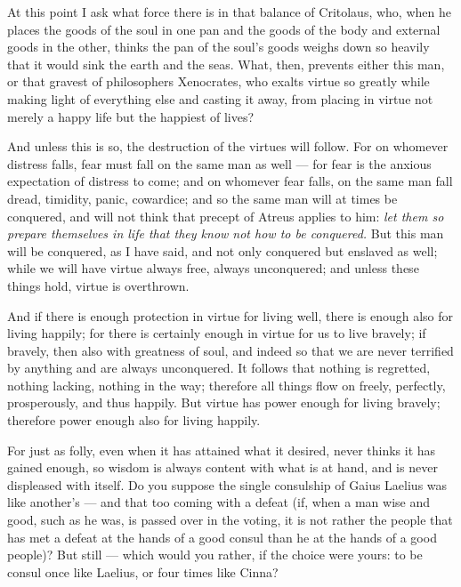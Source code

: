  At this point I ask what force there is in that balance of Critolaus, who, when he places the goods of the soul in one pan and the goods of the body and external goods in the other, thinks the pan of the soul's goods weighs down so heavily that it would sink the earth and the seas. What, then, prevents either this man, or that gravest of philosophers Xenocrates, who exalts virtue so greatly while making light of everything else and casting it away, from placing in virtue not merely a happy life but the happiest of lives?

 And unless this is so, the destruction of the virtues will follow. For on whomever distress falls, fear must fall on the same man as well — for fear is the anxious expectation of distress to come; and on whomever fear falls, on the same man fall dread, timidity, panic, cowardice; and so the same man will at times be conquered, and will not think that precept of Atreus applies to him: \textit{let them so prepare themselves in life that they know not how to be conquered.} But this man will be conquered, as I have said, and not only conquered but enslaved as well; while we will have virtue always free, always unconquered; and unless these things hold, virtue is overthrown.

 And if there is enough protection in virtue for living well, there is enough also for living happily; for there is certainly enough in virtue for us to live bravely; if bravely, then also with greatness of soul, and indeed so that we are never terrified by anything and are always unconquered. It follows that nothing is regretted, nothing lacking, nothing in the way; therefore all things flow on freely, perfectly, prosperously, and thus happily. But virtue has power enough for living bravely; therefore power enough also for living happily.

 For just as folly, even when it has attained what it desired, never thinks it has gained enough, so wisdom is always content with what is at hand, and is never displeased with itself. Do you suppose the single consulship of Gaius Laelius was like another's — and that too coming with a defeat (if, when a man wise and good, such as he was, is passed over in the voting, it is not rather the people that has met a defeat at the hands of a good consul than he at the hands of a good people)? But still — which would you rather, if the choice were yours: to be consul once like Laelius, or four times like Cinna?

